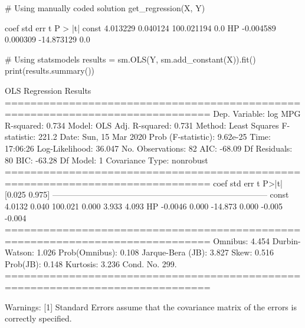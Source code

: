 \begin{python}
# Using manually coded solution
get_regression(X, Y)
\end{python}

\begin{console}
	coef	std err	t	P > |t|
const	4.013229	0.040124	100.021194	0.0
HP	-0.004589	0.000309	-14.873129	0.0
\end{console}

\begin{python}
# Using statsmodels
results = sm.OLS(Y, sm.add_constant(X)).fit()
print(results.summary())
\end{python}

\begin{console}
                            OLS Regression Results
==============================================================================
Dep. Variable:                log MPG   R-squared:                       0.734
Model:                            OLS   Adj. R-squared:                  0.731
Method:                 Least Squares   F-statistic:                     221.2
Date:                Sun, 15 Mar 2020   Prob (F-statistic):           9.62e-25
Time:                        17:06:26   Log-Likelihood:                 36.047
No. Observations:                  82   AIC:                            -68.09
Df Residuals:                      80   BIC:                            -63.28
Df Model:                           1
Covariance Type:            nonrobust
==============================================================================
                 coef    std err          t      P>|t|      [0.025      0.975]
------------------------------------------------------------------------------
const          4.0132      0.040    100.021      0.000       3.933       4.093
HP            -0.0046      0.000    -14.873      0.000      -0.005      -0.004
==============================================================================
Omnibus:                        4.454   Durbin-Watson:                   1.026
Prob(Omnibus):                  0.108   Jarque-Bera (JB):                3.827
Skew:                           0.516   Prob(JB):                        0.148
Kurtosis:                       3.236   Cond. No.                         299.
==============================================================================

Warnings:
[1] Standard Errors assume that the covariance matrix of the errors is correctly
specified.
\end{console}

